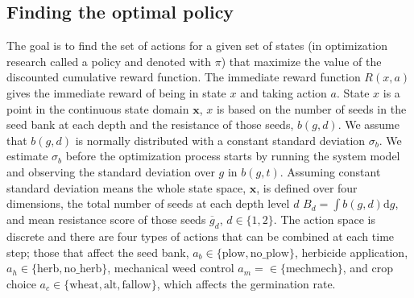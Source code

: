 \documentclass[12pt, a4paper]{article}
\begin{document}
\subsection{Finding the optimal policy}
The goal is to find the set of actions for a given set of states (in optimization research called a policy and denoted with $\pi$) that maximize the value of the discounted cumulative reward function. The immediate reward function $R(x, a)$ gives the immediate reward of being in state $x$ and taking action $a$. State $x$ is a point in the continuous state domain $\mathbf{x}$, $x$ is based on the number of seeds in the seed bank at each depth and the resistance of those seeds, $b(g, d)$. We assume that $b(g, d)$ is normally distributed with a constant standard deviation $\sigma_b$. We estimate $\sigma_b$ before the optimization process starts by running the system model and observing the standard deviation over $g$ in $b(g, t)$. Assuming constant standard deviation means the whole state space, $\mathbf{x}$, is defined over four dimensions, the total number of seeds at each depth level $d$ $B_d = \int b(g, d)\text{d}g$, and mean resistance score of those seeds $\overline{g}_d$, $d \in \{1, 2\}$. The action space is discrete and there are four types of actions that can be combined at each time step; those that affect the seed bank, $a_b \in \{\text{plow}, \text{no\_plow}\}$, herbicide application, $a_h \in \{\text{herb}, \text{no\_herb}\}$, mechanical weed control $a_m = \in \{\text{mech} \text{mech}\}$, and crop choice $a_c \in \{\text{wheat}, \text{alt}, \text{fallow}\}$, which affects the germination rate. 
\end{document}
